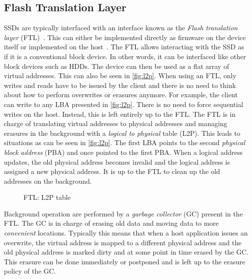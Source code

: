 \subsection{Flash Translation Layer}
SSDs are typically interfaced with an interface known as the \textit{Flash translation layer} (FTL)~\cite{kwon2011ftl, chung2009survey}. This can either be implemented directly as firmware on the device itself or implemented on the host~\cite{jhin2018optimizing}. The FTL allows interacting with the SSD as if it is a conventional block device. In other words, it can be interfaced like other block devices such as HDDs. The device can then be used as a flat array of virtual addresses. This can also be seen in \autoref{fig:l2p}. When using an FTL, only writes and reads have to be issued by the client and there is no need to think about how to perform overwrites or erasures anymore. For example, the client can write to any LBA presented in \autoref{fig:l2p}. There is no need to force sequential writes on the host. Instead, this is left entirely up to the FTL. The FTL is in charge of translating virtual addresses to physical addresses and managing erasures in the background with a \textit{logical to physical} table (L2P). This leads to situations as can be seen in \autoref{fig:l2p}. The first LBA points to the second \textit{physical block address} (PBA) and once pointed to the first PBA. When a logical address updates, the old physical address becomes invalid and the logical address is assigned a new physical address. It is up to the FTL to clean up the old addresses on the background. 

\begin{figure}[h]
\centering
\begin{minipage}{0.75\textwidth}
  \centering
  
\end{minipage}%
\caption{ FTL: L2P table }
\label{fig:l2p}
\end{figure}

Background operation are performed by a \textit{garbage collector} (GC) present in the FTL. The GC is in charge of erasing old data and moving data to more \textit{convenient} locations. Typically this means that when a host application issues an overwrite, the virtual address is mapped to a different physical address and the old physical address is marked dirty and at some point in time erased by the GC. This erasure can be done immediately or postponed and is left up to the erasure policy of the GC.

